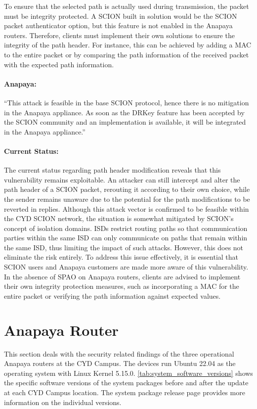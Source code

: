 To ensure that the selected path is actually used during transmission, the packet must be integrity protected.
A SCION built in solution would be the SCION packet authenticator option, but this feature is not enabled in the Anapaya routers.
Therefore, clients must implement their own solutions to ensure the integrity of the path header.
For instance, this can be achieved by adding a MAC to the entire packet or by comparing the path information of the received packet with the expected path information.

\begin{boxH}
\paragraph{Anapaya:}
``This attack is feasible in the base SCION protocol, hence there is no mitigation in the Anapaya appliance. As soon as the DRKey feature has been accepted by the SCION community and an implementation is available, it will be integrated in the Anapaya appliance.''
\end{boxH}

\paragraph{Current Status:}
The current status regarding path header modification reveals that this vulnerability remains exploitable.
An attacker can still intercept and alter the path header of a SCION packet, rerouting it according to their own choice, while the sender remains unaware due to the potential for the path modifications to be reverted in replies.
Although this attack vector is confirmed to be feasible within the CYD SCION network, the situation is somewhat mitigated by SCION's concept of isolation domains.
ISDs restrict routing paths so that communication parties within the same ISD can only communicate on paths that remain within the same ISD, thus limiting the impact of such attacks.
However, this does not eliminate the risk entirely.
To address this issue effectively, it is essential that SCION users and Anapaya customers are made more aware of this vulnerability.
In the absence of SPAO on Anapaya routers, clients are advised to implement their own integrity protection measures, such as incorporating a MAC for the entire packet or verifying the path information against expected values.

\section{Anapaya Router}
\label{sec:findings:anapaya-router}
This section deals with the security related findings of the three operational Anapaya routers at the CYD Campus.
The devices run Ubuntu 22.04 as the operating system with Linux Kernel 5.15.0.
\cref{tab:system_software_versions} shows the specific software versions of the system packages before and after the update at each CYD Campus location.
The system package release page \cite{anapayaSystemPackage} provides more information on the individual versions.

